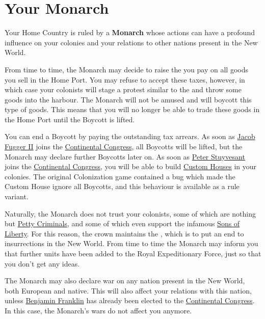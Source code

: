 \documentclass[12pt]{book}
\begin{document}
\hypertarget{Monarch}{\section{Your Monarch}}

Your Home Country is ruled by a \textbf{Monarch} whose actions can
have a profound influence on your colonies and your relations to other
nations present in the New World. 

From time to time, the Monarch may decide to raise the
 you pay on all goods you sell in the Home
Port. You may refuse to accept these taxes, however, in which case
your colonists will stage a protest similar to the  and throw some goods into the harbour. The Monarch will not be
amused and will  \hypertarget{Boycotts}{boycott} this
type of goods. This means that you will no longer be able to trade
these goods in the Home Port until the Boycott is lifted.

You can end a Boycott by paying the outstanding tax arrears. As soon
as \hyperlink{Jacob Fugger II}{Jacob Fugger II} joins the
\hyperlink{Continental Congress}{Continental Congress}, all Boycotts
will be lifted, but the Monarch may declare further Boycotts later
on. As soon as \hyperlink{Peter Stuyvesant}{Peter Stuyvesant} joins
the \hyperlink{Continental Congress}{Continental Congress}, you will
be able to build \hyperlink{Custom House}{Custom Houses} in your
colonies. The original Colonization game contained a bug which made
the Custom House ignore all Boycotts, and this behaviour is available
as a rule variant.

Naturally, the Monarch does not trust your colonists, some of which
are nothing but \hyperlink{Petty Criminal}{Petty Criminals}, and some
of which even support the infamous \hyperlink{Sons of Liberty}{Sons of
Liberty}. For this reason, the crown maintains the
, which is to put an end to
insurrections in the New World. From time to time the Monarch may
inform you that further units have been added to the Royal
Expeditionary Force, just so that you don't get any ideas.

The Monarch may also declare war on any nation present in the New
World, both European and native. This will also affect your relations
with this nation, unless \hyperlink{Benjamin Franklin}{Benjamin
Franklin} has already been elected to the \hyperlink{Continental
Congress}{Continental Congress}. In this case, the Monarch's wars do
not affect you anymore.
\end{document}
